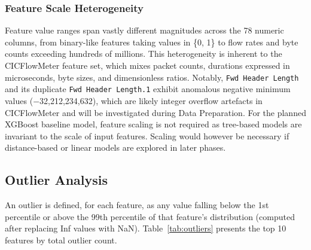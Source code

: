 \documentclass[12pt,a4paper]{article}
\begin{document}
\subsubsection{Feature Scale Heterogeneity}

Feature value ranges span vastly different magnitudes across the 78 numeric columns,
from binary-like features taking values in \{0, 1\} to flow rates and byte counts
exceeding hundreds of millions. This heterogeneity is inherent to the CICFlowMeter
feature set, which mixes packet counts, durations expressed in microseconds, byte
sizes, and dimensionless ratios. Notably, \texttt{Fwd Header Length} and its duplicate
\texttt{Fwd Header Length.1} exhibit anomalous negative minimum values
($-$32,212,234,632), which are likely integer overflow artefacts in CICFlowMeter and
will be investigated during Data Preparation. For the planned XGBoost baseline model,
feature scaling is not required as tree-based models are invariant to the scale of
input features. Scaling would however be necessary if distance-based or linear models
are explored in later phases.

\subsection{Outlier Analysis}

An outlier is defined, for each feature, as any value falling below the 1st percentile
or above the 99th percentile of that feature's distribution (computed after replacing
Inf values with NaN). Table~\ref{tab:outliers} presents the top 10 features by total
outlier count.
\end{document}
